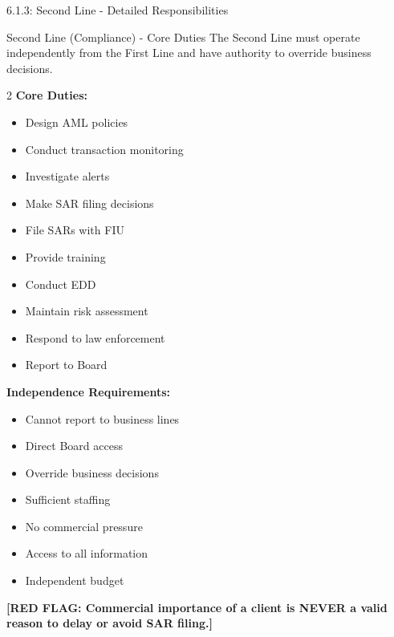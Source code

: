 \documentclass[11pt,a4paper]{beamer}
\newcommand{\redflag}[1]{\textcolor{red!80!black}{\textbf{[RED FLAG: #1]}}}
\begin{document}
\begin{frame}{6.1.3: Second Line - Detailed Responsibilities}
	\begin{block}{Second Line (Compliance) - Core Duties}
		The Second Line must operate independently from the First Line and have authority to override business decisions.
	\end{block}
	\begin{multicols}{2}
		\textbf{Core Duties:}
		\begin{itemize}
			\item Design AML policies
			\item Conduct transaction monitoring
			\item Investigate alerts
			\item Make SAR filing decisions
			\item File SARs with FIU
			\item Provide training
			\item Conduct EDD
			\item Maintain risk assessment
			\item Respond to law enforcement
			\item Report to Board
		\end{itemize}
		\columnbreak
		\textbf{Independence Requirements:}
		\begin{itemize}
			\item Cannot report to business lines
			\item Direct Board access
			\item Override business decisions
			\item Sufficient staffing
			\item No commercial pressure
			\item Access to all information
			\item Independent budget
		\end{itemize}
	\end{multicols}
	\redflag{Commercial importance of a client is NEVER a valid reason to delay or avoid SAR filing.}
\end{frame}
\end{document}
